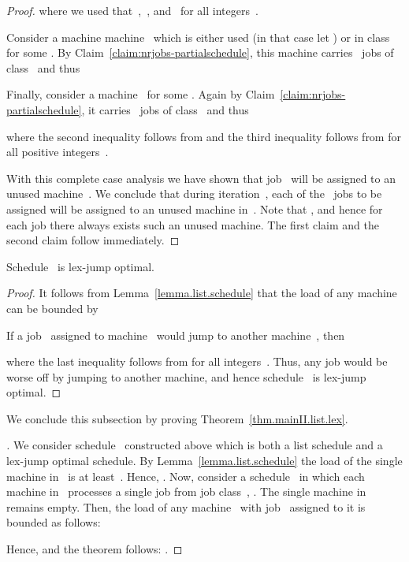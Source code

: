 \documentclass[a4paper,11pt,fleqn]{article}
\begin{document}
\begin{proof}
where we used that~,~, and~ for all integers~.

Consider a machine machine~ which is either used (in that case let ) or in class~ for some . By Claim~\ref{claim:nrjobs-partialschedule}, this machine carries~ jobs of class~ and thus


Finally, consider a machine~ for some
. Again by
Claim~\ref{claim:nrjobs-partialschedule}, it carries~ jobs
of class~ and thus

where the second inequality follows from  and the third inequality follows from  for all positive integers~.


With this complete case analysis we have shown that job~ will be
assigned to an unused machine~. We conclude that during
iteration~, each of the~ jobs to be assigned will be
assigned to an unused machine in~. Note that , and hence for each job there always exists such an unused machine. The first claim and the second claim follow immediately.
\end{proof}

\begin{lemma}
Schedule~ is lex-jump optimal.
\end{lemma}

\begin{proof}
It follows from Lemma~\ref{lemma.list.schedule} that the load of any
machine~ can be bounded by

If a job~ assigned to machine~ would jump to another
machine~, then

where the last inequality follows from  for all integers~. Thus, any job would be worse off by jumping to another machine, and hence schedule~ is lex-jump optimal.
\end{proof}

We conclude this subsection by proving Theorem~\ref{thm.mainII.list.lex}.

\begin{proof}[]
We consider schedule~ constructed above which is both a list
schedule and a lex-jump optimal schedule. By
Lemma~\ref{lemma.list.schedule} the load of the single machine in~
is at least~. Hence, . Now, consider a
schedule~ in which each machine in~ processes a single
job from job class~, . The single
machine in~ remains empty. Then, the load of any machine~ with job~ assigned to it is bounded as follows:

Hence,  and the theorem follows: .
\end{proof}
\end{document}
